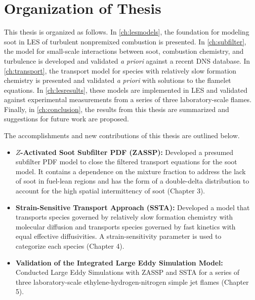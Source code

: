 \section{Organization of Thesis}
\label{sec:intro:org}

This thesis is organized as follows. In \cref{ch:lesmodels}, the foundation for modeling soot in LES of turbulent nonpremixed combustion is presented. In \cref{ch:subfilter}, the model for small-scale interactions between soot, combustion chemistry, and turbulence is developed and validated \textit{a priori} against a recent DNS database. In \cref{ch:transport}, the transport model for species with relatively slow formation chemistry is presented and validated \textit{a priori} with solutions to the flamelet equations. In \cref{ch:lesresults}, these models are implemented in LES and validated against experimental measurements from a series of three laboratory-scale flames. Finally, in \cref{ch:conclusion}, the results from this thesis are summarized and suggestions for future work are proposed.

The accomplishments and new contributions of this thesis are outlined below.
\begin{itemize}
\item \textbf{$Z$-Activated Soot Subfilter PDF (ZASSP):} Developed a presumed subfilter PDF model to close the filtered transport equations for the soot model. It contains a dependence on the mixture fraction to address the lack of soot in fuel-lean regions and has the form of a double-delta distribution to account for the high spatial intermittency of soot (Chapter 3).
\item \textbf{Strain-Sensitive Transport Approach (SSTA):} Developed a model that transports species governed by relatively slow formation chemistry with molecular diffusion and transports species governed by fast kinetics with equal effective diffusivities. A strain-sensitivity parameter is used to categorize each species (Chapter 4).
\item \textbf{Validation of the Integrated Large Eddy Simulation Model:} Conducted Large Eddy Simulations with ZASSP and SSTA for a series of three laboratory-scale ethylene-hydrogen-nitrogen simple jet flames (Chapter 5).
\end{itemize}
